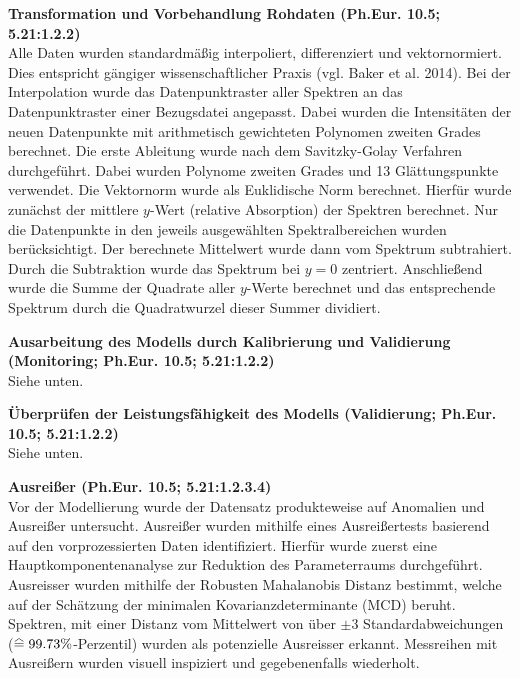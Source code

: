 \documentclass[11pt, a4paper]{article}
\newcommand\equalhat{\mathrel{\stackon[1.5pt]{=}{\stretchto{%
    \scalerel*[\widthof{=}]{\wedge}{\rule{1ex}{3ex}}}{0.5ex}}}}
\newcommand\VersionPhEur{10.5}
\begin{document}
\textbf{Transformation und Vorbehandlung Rohdaten (Ph.Eur. \VersionPhEur; 5.21:1.2.2)}\\[1.2pt]
Alle Daten wurden standardmäßig interpoliert, differenziert  und vektornormiert. Dies entspricht gängiger wissenschaftlicher Praxis (vgl. Baker et al. 2014). Bei der Interpolation wurde das Datenpunktraster aller Spektren an das Datenpunktraster einer Bezugsdatei angepasst. Dabei wurden die Intensitäten der neuen Datenpunkte mit arithmetisch gewichteten Polynomen zweiten Grades berechnet. Die erste Ableitung wurde nach dem Savitzky-Golay Verfahren durchgeführt. Dabei wurden Polynome zweiten Grades und 13 Glättungspunkte verwendet. Die Vektornorm wurde als Euklidische Norm berechnet. Hierfür wurde zunächst der mittlere $y$-Wert (relative Absorption) der Spektren berechnet. Nur die Datenpunkte in den jeweils ausgewählten Spektralbereichen wurden berücksichtigt. Der berechnete Mittelwert wurde dann vom Spektrum subtrahiert. Durch die Subtraktion wurde das Spektrum bei $y = 0$ zentriert. Anschließend wurde die Summe der Quadrate aller $y$-Werte berechnet und das entsprechende Spektrum durch die Quadratwurzel dieser Summer dividiert.

\textbf{Ausarbeitung des Modells durch Kalibrierung und Validierung (Monitoring; Ph.Eur. \VersionPhEur; 5.21:1.2.2)}\\[1.2pt]
Siehe unten.

\textbf{Überprüfen der Leistungsfähigkeit des Modells (Validierung; Ph.Eur. \VersionPhEur; 5.21:1.2.2)}\\[1.2pt]
Siehe unten.

\textbf{Ausreißer (Ph.Eur. \VersionPhEur; 5.21:1.2.3.4)}\\[1.2pt]
Vor der Modellierung wurde der Datensatz produkteweise auf Anomalien und Ausreißer untersucht. Ausreißer wurden mithilfe eines Ausreißertests basierend auf den vorprozessierten Daten identifiziert. Hierfür wurde zuerst eine Hauptkomponentenanalyse zur Reduktion des Parameterraums durchgeführt. Ausreisser wurden mithilfe der Robusten Mahalanobis Distanz bestimmt, welche auf der Schätzung der minimalen Kovarianzdeterminante (MCD) beruht. Spektren, mit einer Distanz vom Mittelwert von über $\pm 3$ Standardabweichungen ($\equalhat  99.73\%$-Perzentil) wurden als potenzielle Ausreisser erkannt. Messreihen mit Ausreißern wurden visuell inspiziert und gegebenenfalls wiederholt.
\end{document}
